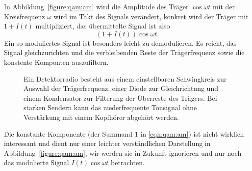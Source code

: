In Abbildung~\ref{figure:qam:am} wird die Amplitude des Träger
$\cos\omega t$ mit der Kreisfrequenz $\omega$ wird im Takt des
Signals verändert,
konkret wird der Träger mit $1+I(t)$ multipliziert,
das übermittelte Signal ist also
\begin{equation}
(1+I(t)) \cos\omega t.
\label{eqn:qam:am}
\end{equation}
Ein so moduliertes Signal ist besonders leicht zu demodulieren.
Es reicht, das Signal gleichzurichten und die verbleibenden Reste
der Trägerfrequenz sowie die konstente Komponten auszufiltern.
\begin{figure}
\centering
{}
\caption{Ein Detektorradio besteht aus einem einstellbaren
Schwingkreis zur Auswahl der Trägerfrequenz, einer Diode zur
Gleichrichtung und einem Kondensator zur Filterung der Überreste
des Trägers.
Bei starken Sendern kann das niederfrequente Tonsignal ohne
Verstärkung mit einem Kopfhörer abgehört werden.
\label{figure:qam:detektor}}
\end{figure}
Die konstante Komponente (der Summand $1$ in \eqref{eqn:qam:am})
ist nicht wirklich interessant und dient nur einer leichter
verständlichen Darstellung in Abbildung~\ref{figure:qam:am},
wir werden sie in Zukunft ignorieren und nur noch das modulierte Signal
$I(t)\cos\omega t$ betrachten.

